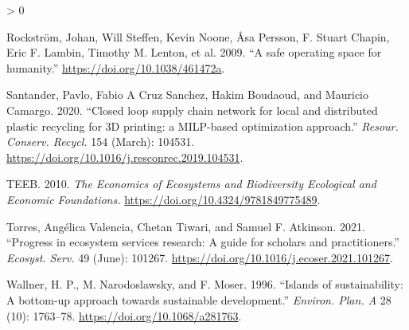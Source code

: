 \documentclass[
  14pt,
]{extarticle}
\newlength{\cslhangindent}
\newenvironment{CSLReferences}[2] %
 {%
  \setlength{\parindent}{0pt}
  \ifodd #1 \everypar{\setlength{\hangindent}{\cslhangindent}}\ignorespaces\fi
  \ifnum #2 > 0
  \setlength{\parskip}{#2\baselineskip}
  \fi
 }%
 {}
\begin{document}
\begin{CSLReferences}{1}{0}
\leavevmode\hypertarget{ref-Rockstrom2009}{}%
Rockström, Johan, Will Steffen, Kevin Noone, Åsa Persson, F. Stuart Chapin, Eric F. Lambin, Timothy M. Lenton, et al. 2009. {``{A safe operating space for humanity}.''} \url{https://doi.org/10.1038/461472a}.

\leavevmode\hypertarget{ref-Santander2020}{}%
Santander, Pavlo, Fabio A Cruz Sanchez, Hakim Boudaoud, and Mauricio Camargo. 2020. {``{Closed loop supply chain network for local and distributed plastic recycling for 3D printing: a MILP-based optimization approach}.''} \emph{Resour. Conserv. Recycl.} 154 (March): 104531. \url{https://doi.org/10.1016/j.resconrec.2019.104531}.

\leavevmode\hypertarget{ref-TEEB2010}{}%
TEEB. 2010. \emph{{The Economics of Ecosystems and Biodiversity Ecological and Economic Foundations.}} \url{https://doi.org/10.4324/9781849775489}.

\leavevmode\hypertarget{ref-Torres2021}{}%
Torres, Angélica Valencia, Chetan Tiwari, and Samuel F. Atkinson. 2021. {``{Progress in ecosystem services research: A guide for scholars and practitioners}.''} \emph{Ecosyst. Serv.} 49 (June): 101267. \url{https://doi.org/10.1016/j.ecoser.2021.101267}.

\leavevmode\hypertarget{ref-Wallner1996}{}%
Wallner, H. P., M. Narodoslawsky, and F. Moser. 1996. {``{Islands of sustainability: A bottom-up approach towards sustainable development}.''} \emph{Environ. Plan. A} 28 (10): 1763--78. \url{https://doi.org/10.1068/a281763}.

\end{CSLReferences}
\end{document}

